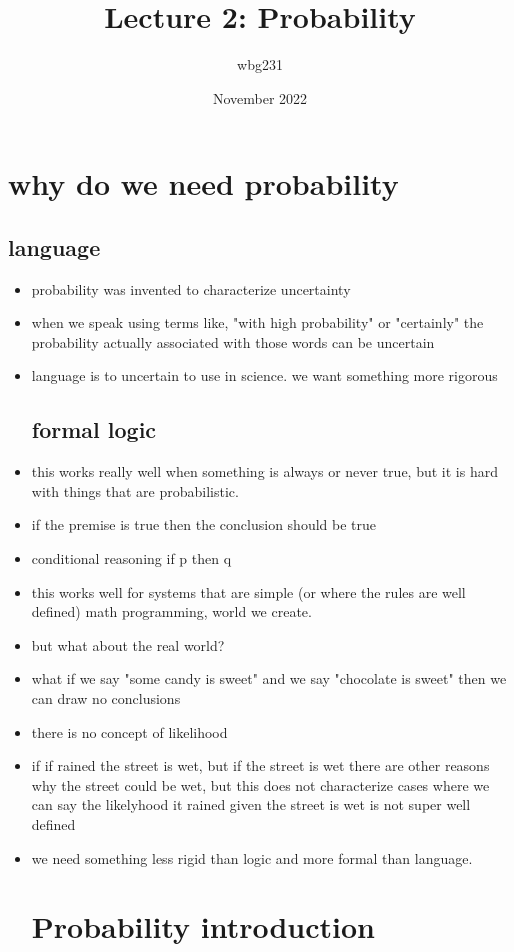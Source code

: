 \documentclass{article}
\title{Lecture 2: Probability }
\author{wbg231 }
\date{November 2022}
\begin{document}
\maketitle

\section{why do we need probability}
\subsection{ language}
\begin{itemize}
    \item probability was invented to characterize uncertainty
    \item when we speak using terms like, "with high probability" or "certainly" the probability actually associated with those words can be uncertain
    \item language is to uncertain to use in science. we want something more rigorous 
\subsection{formal logic}
\item this works really well when something is always or never true, but it is hard with things that are probabilistic. 
\item if the premise is true then the conclusion should be true
\item conditional reasoning if p then q 
\item this works well for systems that are simple (or where the rules are well defined) math programming, world we create. 
\item but what about the real world?
\item what if we say "some candy is sweet" and we say "chocolate is sweet" then we can draw no conclusions 
\item there is no concept of likelihood
\item if if rained the street is wet, but if the street is wet there are other reasons why the street could be wet, but this does not characterize cases where we can say the likelyhood it rained given the street is wet is not super well defined 
\item we need something less rigid than logic and more formal than language. 
\section{Probability introduction}

\end{itemize}
\end{document}
